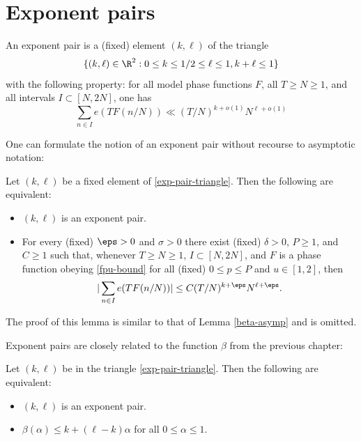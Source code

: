 \chapter{Exponent pairs}\label{exponent-pairs-chapter}

\begin{definition}\label{exp-pair-def}
\leanok
An exponent pair is a (fixed) element $(k,\ell)$ of the triangle
\begin{equation}\label{exp-pair-triangle}
    \{ (k,\ell) \in \R^2: 0 \leq k \leq 1/2 \leq \ell \leq 1, k+\ell \leq 1 \}
\end{equation}
with the following property: for all model phase functions $F$, all $T \geq N \geq 1$, and all intervals $I \subset [N,2N]$, one has
\begin{equation}\label{ntf}
 \sum_{n \in I} e(T F(n/N)) \ll (T/N)^{k+o(1)} N^{\ell+o(1)}
\end{equation}
\end{definition}


One can formulate the notion of an exponent pair without recourse to asymptotic notation:

\begin{lemma}  Let $(k,\ell)$ be a fixed element of \eqref{exp-pair-triangle}.  Then the following are equivalent:
    \begin{itemize}
    \item[(i)] $(k,\ell)$ is an exponent pair.
    \item[(ii)] For every (fixed) $\eps>0$ and $\sigma>0$ there exist (fixed) $\delta>0$, $P \geq 1$, and $C \geq 1$ such that, whenever $T \geq N \geq 1$, $I \subset [N,2N]$, and $F$ is a phase function obeying \eqref{fpu-bound} for all (fixed) $0 \leq p \leq P$ and $u \in [1,2]$, then
    $$ |\sum_{n \in I} e(T F(n/N))| \leq C (T/N)^{k+\eps} N^{\ell+\eps}.$$
   \end{itemize}
\end{lemma}

The proof of this lemma is similar to that of Lemma \ref{beta-asymp} and is omitted.

Exponent pairs are closely related to the function $\beta$ from the previous chapter:

\begin{lemma}\label{beta-duality}
\leanok
Let $(k,\ell)$ be in the triangle \eqref{exp-pair-triangle}.  Then the following are equivalent:
    \begin{itemize}
    \item[(i)] $(k,\ell)$ is an exponent pair.
    \item[(ii)] $\beta(\alpha) \leq k + (\ell-k)\alpha$ for all $0 \leq \alpha \leq 1$.
    \end{itemize}
    \end{lemma}

